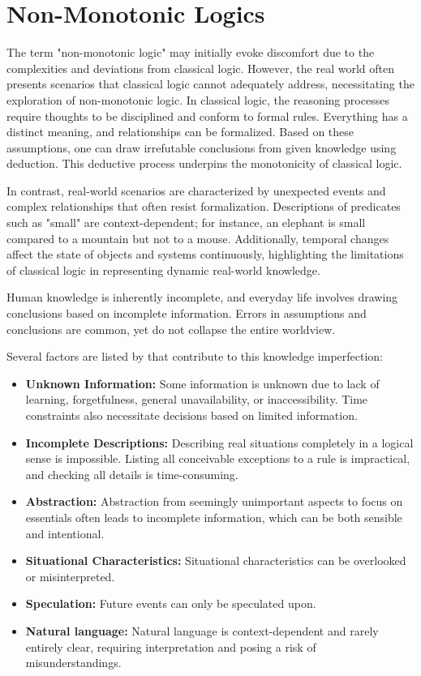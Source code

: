 \section{Non-Monotonic Logics}
The term "non-monotonic logic" may initially evoke discomfort due to the complexities and deviations from classical logic.
However, the real world often presents scenarios that classical logic cannot adequately address, necessitating the exploration of non-monotonic logic.
In classical logic, the reasoning processes require thoughts to be disciplined and conform to formal rules.
Everything has a distinct meaning, and relationships can be formalized. Based on these assumptions, one can draw irrefutable conclusions from given knowledge using deduction.
This deductive process underpins the monotonicity of classical logic.

In contrast, real-world scenarios are characterized by unexpected events and complex relationships that often resist formalization.
Descriptions of predicates such as "small" are context-dependent; for instance, an elephant is small compared to a mountain but not to a mouse.
Additionally, temporal changes affect the state of objects and systems continuously, highlighting the limitations of classical logic in representing dynamic real-world knowledge.

Human knowledge is inherently incomplete, and everyday life involves drawing conclusions based on incomplete information.
Errors in assumptions and conclusions are common, yet do not collapse the entire worldview.

Several factors are listed by \cite{beierle_methoden_2019} that contribute to this knowledge imperfection:
\begin{itemize}
      \item \textbf{Unknown Information:} Some information is unknown due to lack of learning, forgetfulness, general unavailability, or inaccessibility.
            Time constraints also necessitate decisions based on limited information.
      \item \textbf{Incomplete Descriptions:} Describing real situations completely in a logical sense is impossible.
            Listing all conceivable exceptions to a rule is impractical, and checking all details is time-consuming.
      \item \textbf{Abstraction:} Abstraction from seemingly unimportant aspects to focus on essentials often leads to incomplete information, which can be both sensible and intentional.
      \item \textbf{Situational Characteristics:} Situational characteristics can be overlooked or misinterpreted.
      \item \textbf{Speculation:} Future events can only be speculated upon.
      \item \textbf{Natural language:} Natural language is context-dependent and rarely entirely clear, requiring interpretation and posing a risk of misunderstandings.
\end{itemize}

